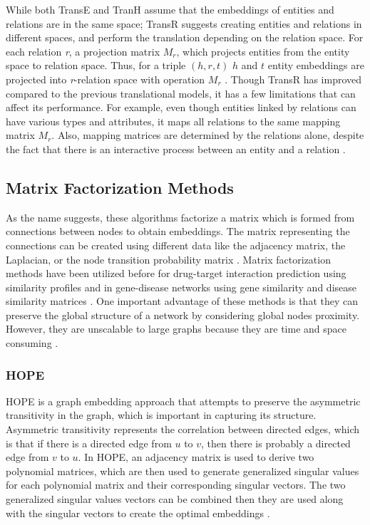 While both TransE and TranH assume that the embeddings of entities and relations are in the same space; TransR suggests creating entities and relations in different spaces, and perform the translation depending on the relation space. For each relation \textit{r}, a projection matrix $M_{r}$, which projects entities from the entity space to relation space.
Thus, for a triple $(h, r, t)$ $h$ and $t$ entity embeddings are projected into \textit{r}-relation space with operation $M_{r}$ \cite{lin_learning_2015}.
Though TransR has improved compared to the previous translational models, it has a few limitations that can affect its performance. For example, even though entities linked by relations can have various types and attributes, it maps all relations to the same mapping matrix $M_{r}$. Also, mapping matrices are determined by the relations alone, despite the fact that there is an interactive process between an entity and a relation \cite{ji_knowledge_2015}.

\subsection{Matrix Factorization Methods}

As the name suggests, these algorithms factorize a matrix which is formed from connections between nodes to obtain embeddings. The matrix representing the connections can be created using different data like the adjacency matrix, the Laplacian, or the node transition probability matrix \cite{goyal_graph_2018}. Matrix factorization methods have been utilized before for drug-target interaction prediction using similarity profiles \cite{ezzat_drug-target_2017, yamanishi_dinies:_2014} and in gene-disease networks using gene similarity and disease similarity matrices \cite{zeng_probability-based_2017}. One important advantage of these methods is that they can preserve the global structure of a network by considering global nodes proximity. However, they are unscalable to large graphs because they are time and space consuming \cite{cai_comprehensive_2017}.

\subsubsection{HOPE}
\ac{HOPE} is a graph embedding approach that attempts to preserve the asymmetric transitivity in the graph, which is important in capturing its structure. Asymmetric transitivity represents the correlation between directed edges, which is that if there is a directed edge from $u$ to $v$, then there is probably a directed edge from $v$ to $u$. In \ac{HOPE}, an adjacency matrix is used to derive two polynomial matrices, which are then used to generate generalized singular values for each polynomial matrix and their corresponding singular vectors. The two generalized singular values vectors can be combined then they are used along with the singular vectors to create the optimal embeddings \cite{ou_asymmetric_2016}.


